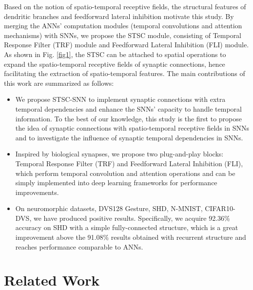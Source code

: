 \documentclass[letterpaper]{article} \usepackage[submission]{aaai23}  \usepackage{times}  \usepackage{helvet}  \usepackage{courier}  \usepackage[hyphens]{url}  \usepackage{graphicx} \urlstyle{rm} \def\UrlFont{\rm}  \usepackage{natbib}  \usepackage{caption} \frenchspacing  \setlength{\pdfpagewidth}{8.5in} \setlength{\pdfpageheight}{11in} \usepackage{algorithm}
\begin{document}
Based on the notion of spatio-temporal receptive fields, the structural features of dendritic branches \cite{letellier_differential_2019} and feedforward lateral inhibition \cite{luo_architectures_nodate} motivate this study. By merging the ANNs’ computation modules (temporal convolutions and attention mechanisms) with SNNs, we propose the
STSC module,
consisting of Temporal Response Filter (TRF) module and Feedforward Lateral Inhibition (FLI) module. As shown in Fig. \ref{fig1}, the STSC can be attached to spatial operations to expand the spatio-temporal receptive fields of synaptic connections, hence facilitating the extraction of spatio-temporal features. 
The main contributions of this work are summarized as follows:
\begin{itemize}
    \item We propose STSC-SNN to implement synaptic connections with extra temporal dependencies and enhance the SNNs' capacity to handle temporal information. To the best of our knowledge, this study is the first to propose the idea of synaptic connections with spatio-temporal receptive fields in SNNs and to investigate the influence of synaptic temporal dependencies in SNNs.
    \item Inspired by biological synapses, we propose two plug-and-play blocks: Temporal Response Filter (TRF) and Feedforward Lateral Inhibition (FLI), which perform temporal convolution and attention operations and can be simply implemented into deep learning frameworks for performance improvements.
\item On neuromorphic datasets, DVS128 Gesture, SHD, N-MNIST, CIFAR10-DVS, we have produced positive results. Specifically, we acquire 92.36\% accuracy on SHD with a simple fully-connected structure, which is a great improvement above the 91.08\% results obtained with recurrent structure and reaches performance comparable to ANNs.
\end{itemize}


\section{Related Work}
\end{document}
